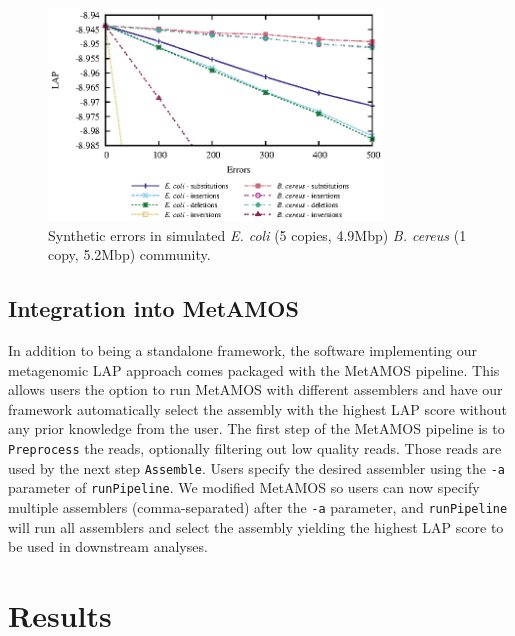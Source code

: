 \begin{figure}[b!]
\centering
\includegraphics[width=3.5in]{errors}
\caption{Synthetic errors in simulated \emph{E. coli} (5 copies, 4.9Mbp) \emph{B. cereus} (1 copy, 5.2Mbp) community.}
\label{fig:errors}
\end{figure}


\subsection{Integration into MetAMOS}

In addition to being a standalone framework, the software implementing our metagenomic LAP approach comes packaged with the MetAMOS pipeline.
This allows users the option to run MetAMOS with different assemblers and have our framework automatically select the assembly with the highest LAP score without any prior knowledge from the user.
The first step of the MetAMOS pipeline is to \verb!Preprocess! the reads, optionally filtering out low quality reads.
Those reads are used by the next step \verb!Assemble!.
Users specify the desired assembler using the \verb!-a! parameter of \verb!runPipeline!.
We modified MetAMOS so users can now specify multiple assemblers (comma-separated) after the \verb!-a! parameter, and \verb!runPipeline! will run all assemblers and select the assembly yielding the highest LAP score to be used in downstream analyses.



\section{Results}

